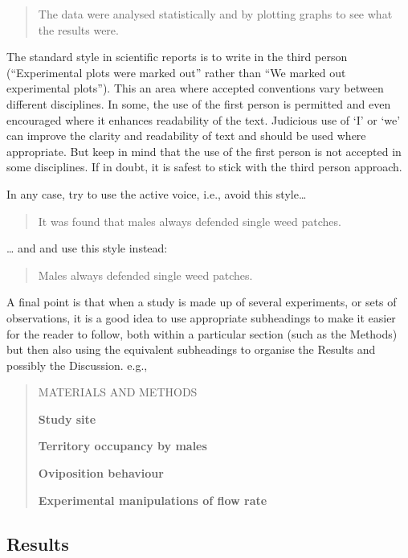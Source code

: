 \documentclass[
]{book}
\begin{document}
\begin{quote}
The data were analysed statistically and by plotting graphs to see what the results were.
\end{quote}

The standard style in scientific reports is to write in the third person (``Experimental plots were marked out'' rather than ``We marked out experimental plots''). This an area where accepted conventions vary between different disciplines. In some, the use of the first person is permitted and even encouraged where it enhances readability of the text. Judicious use of `I' or `we' can improve the clarity and readability of text and should be used where appropriate. But keep in mind that the use of the first person is not accepted in some disciplines. If in doubt, it is safest to stick with the third person approach.

In any case, try to use the active voice, i.e., avoid this style\ldots{}

\begin{quote}
It was found that males always defended single weed patches.
\end{quote}

\ldots{} and and use this style instead:

\begin{quote}
Males always defended single weed patches.
\end{quote}

A final point is that when a study is made up of several experiments, or sets of observations, it is a good idea to use appropriate subheadings to make it easier for the reader to follow, both within a particular section (such as the Methods) but then also using the equivalent subheadings to organise the Results and possibly the Discussion. e.g.,

\begin{quote}
MATERIALS AND METHODS

\textbf{Study site}

\textbf{Territory occupancy by males}

\textbf{Oviposition behaviour}

\textbf{Experimental manipulations of flow rate}
\end{quote}

\hypertarget{results}{%
\subsection{Results}\label{results}}
\end{document}

